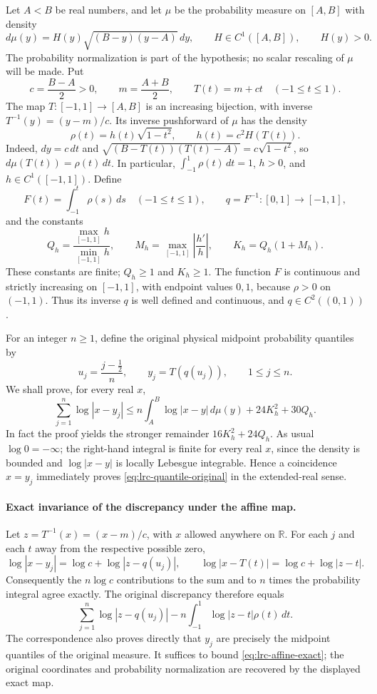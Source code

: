 Let $A<B$ be real numbers, and let $\mu$ be the probability measure on
$[A,B]$ with density
\[
 d\mu(y)=H(y)\sqrt{(B-y)(y-A)}\,dy,
 \qquad H\in C^1([A,B]),\qquad H(y)>0.
\]
The probability normalization is part of the hypothesis; no scalar
rescaling of $\mu$ will be made. Put
\[
 c=\frac{B-A}{2}>0,\qquad m=\frac{A+B}{2},\qquad
 T(t)=m+ct\quad(-1\leq t\leq1).
\]
The map $T:[-1,1]\longrightarrow[A,B]$ is an increasing bijection,
with inverse $T^{-1}(y)=(y-m)/c$. Its inverse pushforward of $\mu$ has
the density
\[
 \rho(t)=h(t)\sqrt{1-t^2},\qquad h(t)=c^2H(T(t)).
\]
Indeed, $dy=c\,dt$ and
$\sqrt{(B-T(t))(T(t)-A)}=c\sqrt{1-t^2}$, so
$d\mu(T(t))=\rho(t)\,dt$. In particular,
$\int_{-1}^1\rho(t)\,dt=1$, $h>0$, and $h\in C^1([-1,1])$.
Define
\[
 F(t)=\int_{-1}^t\rho(s)\,ds\quad(-1\leq t\leq1),\qquad
 q=F^{-1}:[0,1]\longrightarrow[-1,1],
\]
and the constants
\[
 Q_h=\frac{\max_{[-1,1]}h}{\min_{[-1,1]}h},\qquad
 M_h=\max_{[-1,1]}\left|\frac{h'}h\right|,\qquad
 K_h=Q_h(1+M_h).
\]
These constants are finite; $Q_h\geq1$ and $K_h\geq1$. The function
$F$ is continuous and strictly increasing on $[-1,1]$, with endpoint
values $0,1$, because $\rho>0$ on $(-1,1)$. Thus its inverse $q$ is
well defined and continuous, and $q\in C^2((0,1))$.

For an integer $n\geq1$, define the original physical midpoint
probability quantiles by
\[
 u_j=\frac{j-\tfrac12}{n},\qquad y_j=T(q(u_j)),
 \qquad 1\leq j\leq n.
\]
We shall prove, for every real $x$,
\begin{equation}\label{eq:lrc-quantile-original}
 \sum_{j=1}^n\log|x-y_j|
 \leq n\int_A^B\log|x-y|\,d\mu(y)
       +24K_h^2+30Q_h.
\end{equation}
In fact the proof yields the stronger remainder $16K_h^2+24Q_h$.
As usual $\log0=-\infty$; the right-hand integral is finite for every
real $x$, since the density is bounded and $\log|x-y|$ is locally
Lebesgue integrable. Hence a coincidence $x=y_j$ immediately proves
\eqref{eq:lrc-quantile-original} in the extended-real sense.

\paragraph{Exact invariance of the discrepancy under the affine map.}
Let $z=T^{-1}(x)=(x-m)/c$, with $x$ allowed anywhere on $\mathbb R$.
For each $j$ and each $t$ away from the respective possible zero,
\[
 \log|x-y_j|=\log c+\log|z-q(u_j)|,
 \qquad
 \log|x-T(t)|=\log c+\log|z-t|.
\]
Consequently the $n\log c$ contributions to the sum and to $n$ times
the probability integral agree exactly. The original discrepancy
therefore equals
\begin{equation}\label{eq:lrc-affine-exact}
 \sum_{j=1}^n\log|z-q(u_j)|
   -n\int_{-1}^1\log|z-t|\rho(t)\,dt.
\end{equation}
The correspondence also proves directly that $y_j$ are precisely
the midpoint quantiles of the original measure. It suffices to
bound \eqref{eq:lrc-affine-exact}; the original coordinates and
probability normalization are recovered by the displayed exact map.

